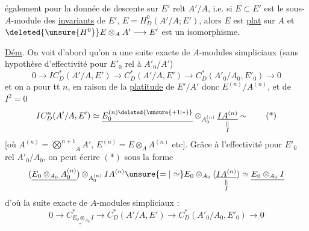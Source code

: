 également pour la donnée de descente sur $E'$ relt $A'/A$, i.e. si $E\subset E'$ est le sous-$A$-module des \uline{invariants} de $E'$, $E=H^0_D(A'/A;E')$, alors $E$ est \uline{plat} sur $A$ et $\deleted{\unsure{H^0}}E\otimes_A A'\longrightarrow E'$ est un isomorphisme.

\uline{Dém}.  On voit d'abord qu'on a une suite  exacte de $A$-modules simpliciaux (sans hypothèse d'effectivité pour $E'_0$ rel à $A'_0/A'$)
\[
0\longrightarrow IC_D^*(A'/A,E')\longrightarrow C_D^*(A'/A,E')\longrightarrow C_D^*(A'_0/A_0,E'_0)\longrightarrow0
\]
 et on a pour tt $n$, en raison de la \uline{platitude} de $E'/A'$ donc $E^{(n)}/A^{(n)}$, et de $I^2=0$
\[
IC_D^n(A'/A,E')\simeq \underline{E_0^{(n)\deleted{\unsure{+1|*}}}}\otimes_{A_0^{(n)}}\underset{\substack{\Vert\\ I}}{\underline{IA^{(n)}}}\sim
\tag*{(*)}
\]
[où $A^{(n)}=\overset{n+1}{\bigotimes}_A A'$, $E^{(n)}=E\otimes_A A^{(n)}$ etc]. Grâce à l'effectivité pour $E'_0$ rel $A'_0/A_0$, on peut écrire $(*)$ sous la forme
\[
(\underline{E_0\otimes_{A_0} A_0^{(n)}})\otimes_{A_0^{(n)}}IA^{(n)}
\unsure{=|\simeq}E_0\otimes_{A_0}(\underset{\substack{\Vert\\I}}{\underline{IA^{(n)}}})\simeq\underline{E_0\otimes_{A_0}I}
\]
d'où la  suite exacte de $A$-modules simpliciaux :
\[
0\longrightarrow \underline{\underline{C^*_{E_0\otimes_{A_0}I}}}\longrightarrow C_D^*(A'/A,E')\longrightarrow C_D^*(A'_0/A_0,E'_0)\longrightarrow0
\]
